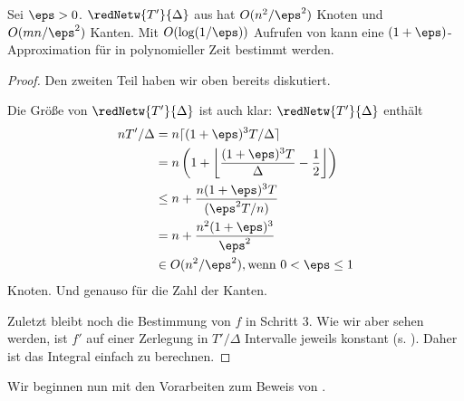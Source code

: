 \begin{theorem}
    Sei $\eps > 0$. $\redNetw{T'}{\Delta}$ aus  hat
    $O(n^2/\eps^2)$ Knoten und $O(mn/\eps^2)$ Kanten. Mit $O(\log(1/\eps))$
    Aufrufen von  kann eine $(1+\eps)$-Approximation
    für  in polynomieller Zeit bestimmt werden.
    \begin{proof}
        Den zweiten Teil haben wir oben bereits diskutiert.

        Die Größe von $\redNetw{T'}{\Delta}$ ist auch klar:
        $\redNetw{T'}{\Delta}$ enthält
        \begin{align*}
            n T'/\Delta & = n \lceil (1 + \eps)^3 T/\Delta \rceil \\
                        & = n \left(1 + \left\lfloor \frac{(1 + \eps)^3 T}{\Delta}
                            -\frac{1}{2} \right\rfloor \right) \\
                        & \leq n + \frac{n(1 + \eps)^3T}{(\eps^2T/n)} \\
                        & = n + \frac{n^2(1 + \eps)^3}{\eps^2} \\
                        & \in O(n^2/\eps^2), \text{wenn } 0 < \eps \leq 1
        \end{align*}
        Knoten. Und genauso für die Zahl der Kanten.


        Zuletzt bleibt noch die Bestimmung von $f$ in Schritt 3. Wie wir aber
        sehen werden, ist $f'$ auf einer Zerlegung in $T'/\Delta$ Intervalle
        jeweils konstant (s. ). Daher ist das Integral einfach
        zu berechnen.
    \end{proof}
\end{theorem}

Wir beginnen nun mit den Vorarbeiten zum Beweis von .

